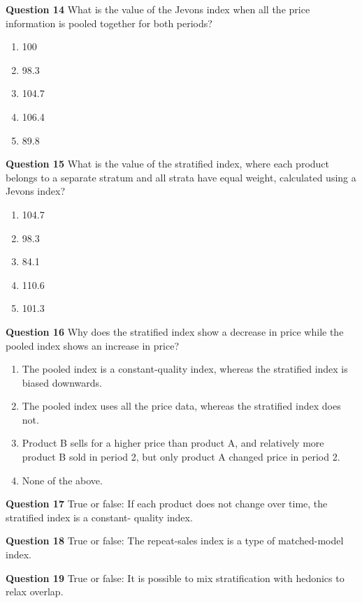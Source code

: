 \documentclass[]{article}
\begin{document}
\textbf{Question 14} What is the value of the Jevons index when all the price information is pooled together for both periods?

\begin{enumerate}
\def\labelenumi{\alph{enumi})}
\item
  100
\item
  98.3
\item
  104.7
\item
  106.4
\item
  89.8
\end{enumerate}

\textbf{Question 15} What is the value of the stratified index, where each product belongs to a separate stratum and all strata have equal weight, calculated using a Jevons index?

\begin{enumerate}
\def\labelenumi{\alph{enumi})}
\item
  104.7
\item
  98.3
\item
  84.1
\item
  110.6
\item
  101.3
\end{enumerate}

\textbf{Question 16} Why does the stratified index show a decrease in price while the pooled index shows an increase in price?

\begin{enumerate}
\def\labelenumi{\alph{enumi})}
\item
  The pooled index is a constant-quality index, whereas the stratified index is biased
  downwards.
\item
  The pooled index uses all the price data, whereas the stratified index does not.
\item
  Product B sells for a higher price than product A, and relatively more product B
  sold in period 2, but only product A changed price in period 2.
\item
  None of the above.
\end{enumerate}

\textbf{Question 17} True or false: If each product does not change over time, the stratified index is a constant- quality index.

\textbf{Question 18} True or false: The repeat-sales index is a type of matched-model index.

\textbf{Question 19} True or false: It is possible to mix stratification with hedonics to relax overlap.
\end{document}
